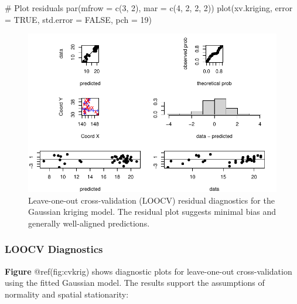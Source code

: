 \documentclass[
  11pt,
]{article}
\newenvironment{Shaded}{\begin{snugshade}}{\end{snugshade}}
\newcommand{\AttributeTok}[1]{\textcolor[rgb]{0.40,0.45,0.13}{#1}}
\newcommand{\CommentTok}[1]{\textcolor[rgb]{0.37,0.37,0.37}{#1}}
\newcommand{\ConstantTok}[1]{\textcolor[rgb]{0.56,0.35,0.01}{#1}}
\newcommand{\DecValTok}[1]{\textcolor[rgb]{0.68,0.00,0.00}{#1}}
\newcommand{\FunctionTok}[1]{\textcolor[rgb]{0.28,0.35,0.67}{#1}}
\newcommand{\NormalTok}[1]{\textcolor[rgb]{0.00,0.23,0.31}{#1}}
\begin{document}
\begin{Shaded}
\begin{Highlighting}[]
\CommentTok{\# Plot residuals}
\FunctionTok{par}\NormalTok{(}\AttributeTok{mfrow =} \FunctionTok{c}\NormalTok{(}\DecValTok{3}\NormalTok{, }\DecValTok{2}\NormalTok{), }\AttributeTok{mar =} \FunctionTok{c}\NormalTok{(}\DecValTok{4}\NormalTok{, }\DecValTok{2}\NormalTok{, }\DecValTok{2}\NormalTok{, }\DecValTok{2}\NormalTok{))}
\FunctionTok{plot}\NormalTok{(xv.kriging, }\AttributeTok{error =} \ConstantTok{TRUE}\NormalTok{, }\AttributeTok{std.error =} \ConstantTok{FALSE}\NormalTok{, }\AttributeTok{pch =} \DecValTok{19}\NormalTok{)}
\end{Highlighting}
\end{Shaded}

\begin{figure}[H]

{\centering \includegraphics{project_files/figure-pdf/fig-cvkrig-1.pdf}

}

\caption{Leave-one-out cross-validation (LOOCV) residual diagnostics for
the Gaussian kriging model. The residual plot suggests minimal bias and
generally well-aligned predictions.}

\end{figure}%

\subsubsection{\texorpdfstring{\textbf{LOOCV
Diagnostics}}{LOOCV Diagnostics}}\label{loocv-diagnostics}

\textbf{Figure} @ref(fig:cvkrig) shows diagnostic plots for
leave-one-out cross-validation using the fitted Gaussian model. The
results support the assumptions of normality and spatial stationarity:
\end{document}
